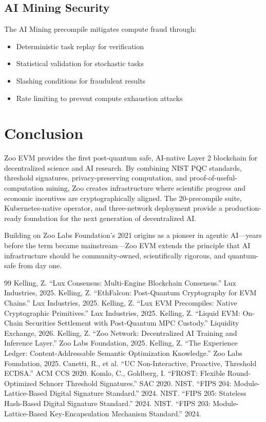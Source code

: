 \documentclass[11pt,a4paper]{article}
\begin{document}
\subsection{AI Mining Security}

The AI Mining precompile mitigates compute fraud through:
\begin{itemize}[nosep]
  \item Deterministic task replay for verification
  \item Statistical validation for stochastic tasks
  \item Slashing conditions for fraudulent results
  \item Rate limiting to prevent compute exhaustion attacks
\end{itemize}

\section{Conclusion}

Zoo EVM provides the first post-quantum safe, AI-native Layer 2 blockchain for decentralized science and AI research. By combining NIST PQC standards, threshold signatures, privacy-preserving computation, and proof-of-useful-computation mining, Zoo creates infrastructure where scientific progress and economic incentives are cryptographically aligned. The 20-precompile suite, Kubernetes-native operator, and three-network deployment provide a production-ready foundation for the next generation of decentralized AI.

Building on Zoo Labs Foundation's 2021 origins as a pioneer in agentic AI---years before the term became mainstream---Zoo EVM extends the principle that AI infrastructure should be community-owned, scientifically rigorous, and quantum-safe from day one.

\begin{thebibliography}{99}
 Kelling, Z. ``Lux Consensus: Multi-Engine Blockchain Consensus.'' Lux Industries, 2025.
 Kelling, Z. ``EthFalcon: Post-Quantum Cryptography for EVM Chains.'' Lux Industries, 2025.
 Kelling, Z. ``Lux EVM Precompiles: Native Cryptographic Primitives.'' Lux Industries, 2025.
 Kelling, Z. ``Liquid EVM: On-Chain Securities Settlement with Post-Quantum MPC Custody.'' Liquidity Exchange, 2026.
 Kelling, Z. ``Zoo Network: Decentralized AI Training and Inference Layer.'' Zoo Labs Foundation, 2025.
 Kelling, Z. ``The Experience Ledger: Content-Addressable Semantic Optimization Knowledge.'' Zoo Labs Foundation, 2025.
 Canetti, R., et al. ``UC Non-Interactive, Proactive, Threshold ECDSA.'' ACM CCS 2020.
 Komlo, C., Goldberg, I. ``FROST: Flexible Round-Optimized Schnorr Threshold Signatures.'' SAC 2020.
 NIST. ``FIPS 204: Module-Lattice-Based Digital Signature Standard.'' 2024.
 NIST. ``FIPS 205: Stateless Hash-Based Digital Signature Standard.'' 2024.
 NIST. ``FIPS 203: Module-Lattice-Based Key-Encapsulation Mechanism Standard.'' 2024.
\end{thebibliography}
\end{document}
